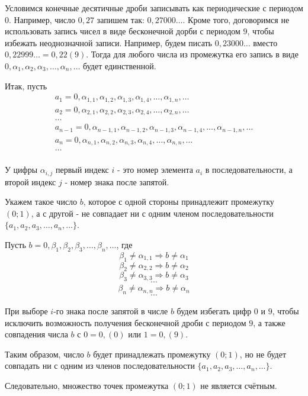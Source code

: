 \documentclass{article}
\begin{document}
Условимся конечные десятичные дроби записывать как периодические с периодом $0$. Например, число $0,27$ запишем так: $0,27000\dots$. Кроме того, договоримся не использовать запись чисел в виде бесконечной дорби с периодом $9$, чтобы избежать неоднозначной записи. Например, будем писать $0,23000\dots$ вместо $0,22999\dots = 0,22(9)$. Тогда для любого числа из промежутка его запись в виде $0, \alpha_1, \alpha_2, \alpha_3, \dots, \alpha_n, \dots$ будет единственной.

Итак, пусть \begin{gather*}
a_1 = 0, \alpha_{1, 1}, \alpha_{1, 2}, \alpha_{1, 3}, \alpha_{1, 4}, \dots, \alpha_{1, n}, \dots \\
a_2 = 0, \alpha_{2, 1}, \alpha_{2, 2}, \alpha_{2, 3}, \alpha_{2, 4}, \dots, \alpha_{2, n}, \dots \\
\dots \\
a_{n-1} = 0, \alpha_{n-1, 1}, \alpha_{n-1, 2}, \alpha_{n-1, 3}, \alpha_{n-1, 4}, \dots, \alpha_{n-1, n}, \dots \\
a_n = 0, \alpha_{n, 1}, \alpha_{n, 2}, \alpha_{n, 3}, \alpha_{n, 4}, \dots, \alpha_{n, n}, \dots \\
\dots \\
\end{gather*}

У цифры $\alpha_{i, j}$ первый индекс $i$ - это номер элемента $a_i$ в последовательности, а второй индекс $j$ - номер знака после запятой.

Укажем такое число $b$, которое с одной стороны принадлежит промежутку $(0; 1)$, а с другой - не совпадает ни с одним членом последовательности $\{a_1, a_2, a_3, \dots, a_n, \dots \}$.

Пусть $b = 0, \beta_1, \beta_2, \beta_3, \dots, \beta_n, \dots$, где \[
	\beta_1 \neq \alpha_{1, 1} \Rightarrow b \neq \alpha_1 \]\[
	\beta_2 \neq \alpha_{2, 2} \Rightarrow b \neq \alpha_2 \]\[
	\beta_3 \neq \alpha_{3, 3} \Rightarrow b \neq \alpha_3 \]\[
	\cdots \]\[
	\beta_n \neq \alpha_{n, n} \Rightarrow b \neq \alpha_n \]\[
	\cdots \]

При выборе $i$-го знака после запятой в числе $b$ будем избегать цифр $0$ и $9$, чтобы исключить возможность получения бесконечной дроби с периодом $9$, а также совпадения числа $b$ с $0 = 0,(0)$ или $1 = 0,(9)$.

Таким образом, число $b$ будет принадлежать промежутку $(0; 1)$, но не будет совпадать ни с одним из членов последовательности $\{a_1, a_2, a_3, \dots, a_n, \dots \}$.

Следовательно, множество точек промежутка $(0; 1)$ не является счётным.
\end{document}
